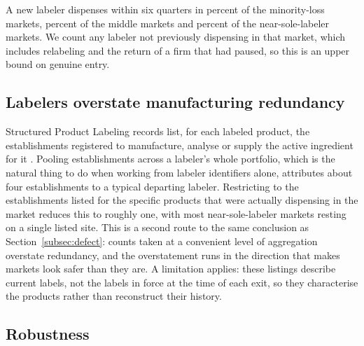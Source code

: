 \documentclass[pdflatex,sn-vancouver-num,Numbered]{sn-jnl}
\begin{document}
A new labeler dispenses within six quarters in \nEntryLo percent of the \nEntryLoN
minority-loss markets, \nEntryMid percent of the \nEntryMidN middle markets and \nEntrySole
percent of the \nEntrySoleN near-sole-labeler markets. We count any labeler not
previously dispensing in that market, which includes relabeling and the return of a firm that had
paused, so this is an upper bound on genuine entry.

\subsection{Labelers overstate manufacturing redundancy}\label{subsec:estab}

Structured Product Labeling records list, for each labeled product, the establishments registered
to manufacture, analyse or supply the active ingredient for it \cite{dailymed}. Pooling
establishments across a labeler's whole portfolio, which is the natural thing to do when working
from labeler identifiers alone, attributes about four establishments to a typical departing
labeler. Restricting to the establishments listed for the specific products that were actually
dispensing in the market reduces this to roughly one, with most near-sole-labeler markets resting on a
single listed site. This is a second route to the same conclusion as
Section~\ref{subsec:defect}: counts taken at a convenient level of aggregation overstate
redundancy, and the overstatement runs in the direction that makes markets look safer than they
are. A limitation applies: these listings describe current labels, not the labels in force at the
time of each exit, so they characterise the products rather than reconstruct their history.

\subsection{Robustness}\label{subsec:robust}
\end{document}
